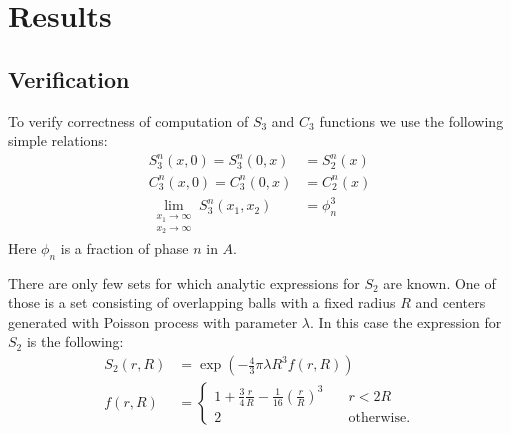 \documentclass[reprint,amsmath,amssymb,aps,pre,showkeys,showpacs]{revtex4-1}
\begin{document}
\section{Results}
\label{sec:results}
\subsection{Verification}
To verify correctness of computation of $S_3$ and $C_3$ functions we use the
following simple relations:
\begin{align}
  S_3^n (x, 0) = S_3^n (0, x) &= S_2^n(x) \\
  C_3^n (x, 0) = C_3^n (0, x) &= C_2^n(x) \\
  \lim_{\substack{x_1 \to \infty \\ x_2 \to \infty}} S_3^n (x_1, x_2) &= \phi_n^3
\end{align}
Here $\phi_n$ is a fraction of phase $n$ in $A$.

There are only few sets for which analytic expressions for $S_2$ are known. One
of those is a set consisting of overlapping balls with a fixed radius $R$ and
centers generated with Poisson process with parameter $\lambda$. In this case
the expression for $S_2$ is the following:
\begin{equation}
  \begin{aligned}
    S_2(r, R) &= \exp(-\frac{4}{3}\pi\lambda R^3 f(r, R)) \\
    f(r, R) &= \left\{
    \begin{array}{ll}
      1 + \frac{3}{4} \frac{r}{R} - \frac{1}{16} (\frac{r}{R})^3 & \quad r < 2R \\
      2 & \quad \text{otherwise}.
    \end{array}
    \right.
  \end{aligned}
  \label{eq:s2-balls}
\end{equation}
\end{document}

